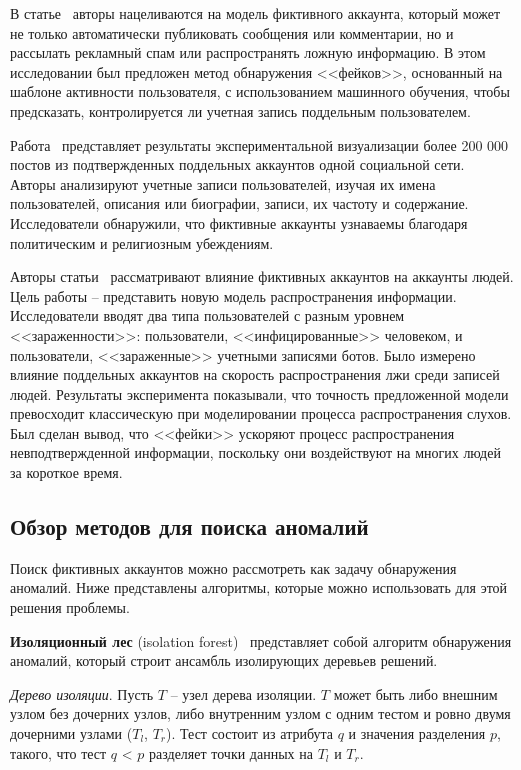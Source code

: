 В статье~\cite{ChenW18} авторы нацеливаются на модель фиктивного аккаунта, который может не только автоматически публиковать сообщения или комментарии, но и рассылать рекламный спам или распространять ложную информацию. В этом исследовании был предложен метод обнаружения <<фейков>>, основанный на шаблоне активности пользователя, с использованием машинного обучения, чтобы предсказать, контролируется ли учетная запись поддельным пользователем.

Работа~\cite{HsuKJ19} представляет результаты экспериментальной визуализации более 200 000 постов из подтвержденных поддельных аккаунтов одной социальной сети. Авторы анализируют учетные записи пользователей, изучая их имена пользователей, описания или биографии, записи, их частоту и содержание. Исследователи обнаружили, что фиктивные аккаунты узнаваемы благодаря политическим и религиозным убеждениям.

Авторы статьи~\cite{FahmyAKE23} рассматривают влияние фиктивных аккаунтов на аккаунты людей. Цель работы -- представить новую модель распространения информации. Исследователи вводят два типа пользователей с разным уровнем <<зараженности>>: пользователи, <<инфицированные>> человеком, и пользователи, <<зараженные>> учетными записями ботов. Было измерено влияние поддельных аккаунтов на скорость распространения лжи среди записей людей. Результаты эксперимента показывали, что точность предложенной модели превосходит классическую при моделировании процесса распространения слухов. Был сделан вывод, что <<фейки>> ускоряют процесс распространения невподтвержденной информации, поскольку они воздействуют на многих людей за короткое время.

\vspace{1.5em}
\subsection{Обзор методов для поиска аномалий}
\label{subsec:Variants}

Поиск фиктивных аккаунтов можно рассмотреть как задачу обнаружения аномалий. Ниже представлены алгоритмы, которые можно использовать для этой решения проблемы.

\textbf{Изоляционный лес} (isolation forest)~\cite{LiuTZ08} представляет собой алгоритм обнаружения аномалий, который строит ансамбль изолирующих деревьев решений. 

\textit{Дерево изоляции}. Пусть $T$ -- узел дерева изоляции. $T$ может быть либо внешним узлом без дочерних узлов, либо внутренним узлом с одним тестом и ровно двумя дочерними узлами ($T_l$, $T_r$). Тест состоит из атрибута $q$ и значения разделения $p$, такого, что тест $q$ < $p$ разделяет точки данных на $T_l$ и $T_r$. 


